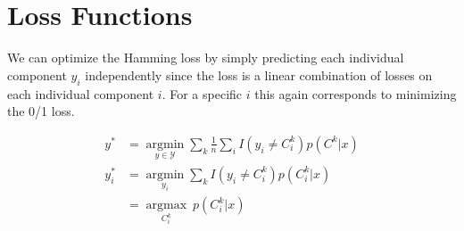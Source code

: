 \section*{Loss Functions} %
\label{sec:loss_functions}
We can optimize the Hamming loss by simply predicting each individual component $y_i$ independently since the loss is a linear combination of losses on each individual component $i$. For a specific $i$ this again corresponds to minimizing the 0/1 loss.

\begin{align}
	y^* &= \underset{y \in \mathcal{Y}}{\operatorname{argmin}} \sum_k \frac{1}{n} \sum_i I(y_i \neq C_i^k) p(C^k|x) \\
	y_i^* &= \underset{y_i}{\operatorname{argmin}} \sum_k I(y_i \neq C_i^k) p(C_i^k|x) \\
	&= \underset{C_i^k}{\operatorname{argmax}} ~ p(C_i^k|x)
\end{align}

